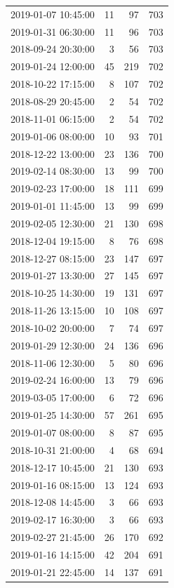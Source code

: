 \begin{tabular}{lrrr}
2019-01-07 10:45:00 & 11 & 97 & 703 \\
2019-01-31 06:30:00 & 11 & 96 & 703 \\
2018-09-24 20:30:00 & 3 & 56 & 703 \\
2019-01-24 12:00:00 & 45 & 219 & 702 \\
2018-10-22 17:15:00 & 8 & 107 & 702 \\
2018-08-29 20:45:00 & 2 & 54 & 702 \\
2018-11-01 06:15:00 & 2 & 54 & 702 \\
2019-01-06 08:00:00 & 10 & 93 & 701 \\
2018-12-22 13:00:00 & 23 & 136 & 700 \\
2019-02-14 08:30:00 & 13 & 99 & 700 \\
2019-02-23 17:00:00 & 18 & 111 & 699 \\
2019-01-01 11:45:00 & 13 & 99 & 699 \\
2019-02-05 12:30:00 & 21 & 130 & 698 \\
2018-12-04 19:15:00 & 8 & 76 & 698 \\
2018-12-27 08:15:00 & 23 & 147 & 697 \\
2019-01-27 13:30:00 & 27 & 145 & 697 \\
2018-10-25 14:30:00 & 19 & 131 & 697 \\
2018-11-26 13:15:00 & 10 & 108 & 697 \\
2018-10-02 20:00:00 & 7 & 74 & 697 \\
2019-01-29 12:30:00 & 24 & 136 & 696 \\
2018-11-06 12:30:00 & 5 & 80 & 696 \\
2019-02-24 16:00:00 & 13 & 79 & 696 \\
2019-03-05 17:00:00 & 6 & 72 & 696 \\
2019-01-25 14:30:00 & 57 & 261 & 695 \\
2019-01-07 08:00:00 & 8 & 87 & 695 \\
2018-10-31 21:00:00 & 4 & 68 & 694 \\
2018-12-17 10:45:00 & 21 & 130 & 693 \\
2019-01-16 08:15:00 & 13 & 124 & 693 \\
2018-12-08 14:45:00 & 3 & 66 & 693 \\
2019-02-17 16:30:00 & 3 & 66 & 693 \\
2019-02-27 21:45:00 & 26 & 170 & 692 \\
2019-01-16 14:15:00 & 42 & 204 & 691 \\
2019-01-21 22:45:00 & 14 & 137 & 691 \\

\end{tabular}
